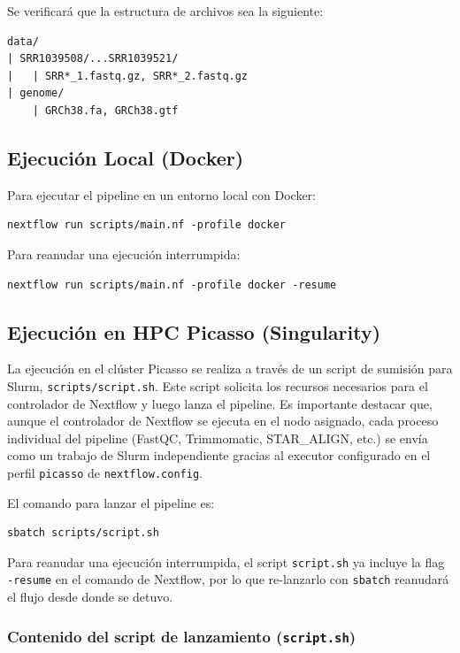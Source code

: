 \documentclass[11pt,a4paper]{article}
\begin{document}
Se verificará que la estructura de archivos sea la siguiente:
\begin{verbatim}
data/
| SRR1039508/...SRR1039521/
|   | SRR*_1.fastq.gz, SRR*_2.fastq.gz
| genome/
    | GRCh38.fa, GRCh38.gtf
\end{verbatim}

\subsection{Ejecución Local (Docker)}

Para ejecutar el pipeline en un entorno local con Docker:

\begin{verbatim}
nextflow run scripts/main.nf -profile docker
\end{verbatim}

Para reanudar una ejecución interrumpida:
\begin{verbatim}
nextflow run scripts/main.nf -profile docker -resume
\end{verbatim}

\subsection{Ejecución en HPC Picasso (Singularity)}

La ejecución en el clúster Picasso se realiza a través de un script de sumisión para Slurm, \texttt{scripts/script.sh}. Este script solicita los recursos necesarios para el controlador de Nextflow y luego lanza el pipeline. Es importante destacar que, aunque el controlador de Nextflow se ejecuta en el nodo asignado, cada proceso individual del pipeline (FastQC, Trimmomatic, STAR\_ALIGN, etc.) se envía como un trabajo de Slurm independiente gracias al executor configurado en el perfil \texttt{picasso} de \texttt{nextflow.config}.

El comando para lanzar el pipeline es:

\begin{verbatim}
sbatch scripts/script.sh
\end{verbatim}

Para reanudar una ejecución interrumpida, el script \texttt{script.sh} ya incluye la flag \texttt{-resume} en el comando de Nextflow, por lo que re-lanzarlo con \texttt{sbatch} reanudará el flujo desde donde se detuvo.

\subsubsection{Contenido del script de lanzamiento (\texttt{script.sh})}
\end{document}
